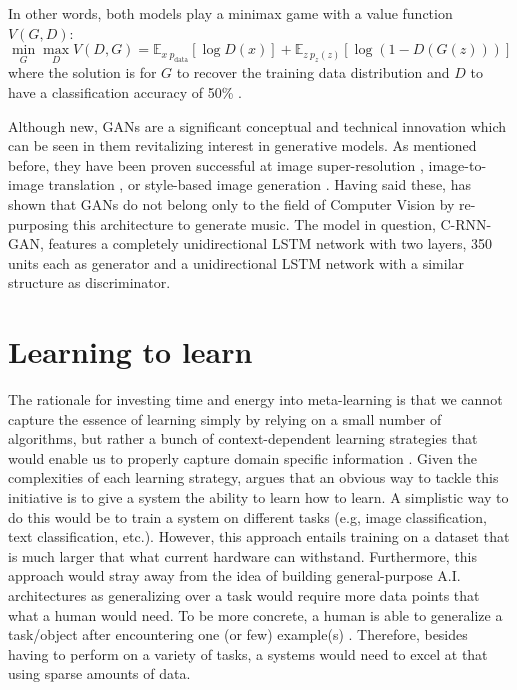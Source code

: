 \documentclass[a4paper]{book}
\begin{document}
In other words, both models play a minimax game with a value function $V(G, D)$:
\begin{equation}
    \min_G \max_D V(D, G) = \mathbb{E}_{x ~ p_{\text{data}}} [ \log D(x) ] + \mathbb{E}_{z ~ p_z (z)} [ \log (1-D(G(z))) ]
\end{equation}
where the solution is for $G$ to recover the training data distribution and $D$ to have a classification accuracy of 50\% \parencite{goodfellow_generative_2014}.

Although new, GANs are a significant conceptual and technical innovation \parencite{briot_deep_2017} which can be seen in them revitalizing interest in generative models. As mentioned before, they have been proven successful at image super-resolution \parencite{ledig_photo-realistic_2016}, image-to-image translation \parencite{isola_image--image_2016}, or style-based image generation \parencite{karras_style-based_2018}. Having said these, \textcite{mogren_c-rnn-gan_2016} has shown that GANs do not belong only to the field of Computer Vision by re-purposing this architecture to generate music. The model in question, C-RNN-GAN, features a completely unidirectional LSTM network with two layers, 350 units each as generator and a unidirectional LSTM network with a similar structure as discriminator.

\section{Learning to learn} \label{sec:learn2learn}

The rationale for investing time and energy into meta-learning is that we cannot capture the essence of learning simply by relying on a small number of algorithms, but rather a bunch of context-dependent learning strategies that would enable us to properly capture domain specific information \parencite{schmidhuber_evolutionary_1987}. Given the complexities of each learning strategy, \textcite{schmidhuber_evolutionary_1987} argues that an obvious way to tackle this initiative is to give a system the ability to learn how to learn. A simplistic way to do this would be to train a system on different tasks (e.g, image classification, text classification, etc.). However, this approach entails training on a dataset that is much larger that what current hardware can withstand. Furthermore, this approach would stray away from the idea of building general-purpose A.I. architectures as generalizing over a task would require more data points that what a human would need. To be more concrete, a human is able to generalize a task/object after encountering one (or few) example(s) \parencite{ravi_optimization_2016, chen_closer_2018}. Therefore, besides having to perform on a variety of tasks, a systems would need to excel at that using sparse amounts of data.
\end{document}
